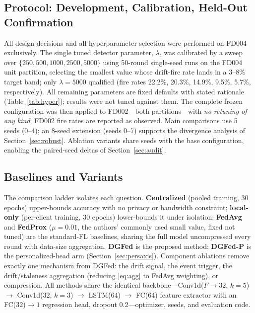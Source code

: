 \documentclass[journal]{IEEEtran}
\newcommand{\dgfed}{DGFed}
\begin{document}
\subsection{Protocol: Development, Calibration, Held-Out Confirmation}\label{sec:protocol}
All design decisions and all hyperparameter selection were performed on FD004 exclusively. The single tuned detector parameter, $\lambda$, was calibrated by a sweep over $\{250, 500, 1000, 2500, 5000\}$ using 50-round single-seed runs on the FD004 unit partition, selecting the smallest value whose drift-fire rate lands in a 3--8\% target band; only $\lambda = 5000$ qualified (fire rates 22.2\%, 20.3\%, 14.9\%, 9.5\%, 5.7\%, respectively). All remaining parameters are fixed defaults with stated rationale (Table~\ref{tab:hyper}); results were not tuned against them. The complete frozen configuration was then applied to FD002---both partitions---with \emph{no retuning of any kind}; FD002 fire rates are reported as observed. Main comparisons use 5 seeds (0--4); an 8-seed extension (seeds 0--7) supports the divergence analysis of Section~\ref{sec:robust}. Ablation variants share seeds with the base configuration, enabling the paired-seed deltas of Section~\ref{sec:audit}.

\subsection{Baselines and Variants}
The comparison ladder isolates each question. \textbf{Centralized} (pooled training, 30 epochs) upper-bounds accuracy with no privacy or bandwidth constraint; \textbf{local-only} (per-client training, 30 epochs) lower-bounds it under isolation; \textbf{FedAvg} \cite{mcmahan2017} and \textbf{FedProx} \cite{li2020fedprox} ($\mu = 0.01$, the authors' commonly used small value, fixed not tuned) are the standard-FL baselines, sharing the full model uncompressed every round with data-size aggregation. \textbf{\dgfed{}} is the proposed method; \textbf{\dgfed{}-P} is the personalized-head arm (Section~\ref{sec:persaxis}). Component ablations remove exactly one mechanism from \dgfed{}: the drift signal, the event trigger, the drift/staleness aggregation (reducing \eqref{eq:agg} to FedAvg weighting), or compression. All methods share the identical backbone---Conv1d($F{\to}32$, $k{=}5$) $\rightarrow$ Conv1d($32$, $k{=}3$) $\rightarrow$ LSTM(64) $\rightarrow$ FC(64) feature extractor with an FC(32)${\to}1$ regression head, dropout 0.2---optimizer, seeds, and evaluation code.
\end{document}
